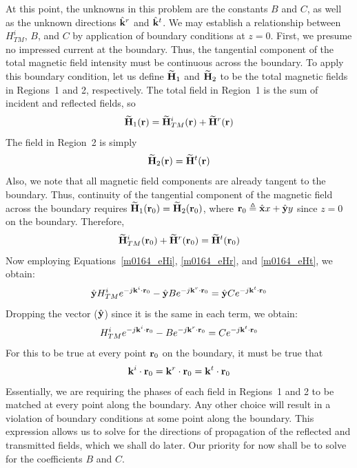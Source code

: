 At this point, the unknowns in this problem are the constants $B$ and $C$, as well as the unknown directions $\hat{\bf k}^r$ and $\hat{\bf k}^t$.  
We may establish a relationship between $H^i_{TM}$, $B$, and $C$ by application of boundary conditions at $z=0$.  
First, we presume no impressed current at the boundary.
Thus, the tangential component of the total magnetic field intensity must be continuous across the boundary.
To apply this boundary condition, let us define $\widetilde{\bf H}_1$ and $\widetilde{\bf H}_2$ to be the total magnetic fields in Regions~1 and 2, respectively.
The total field in Region~1 is the sum of incident and reflected fields, so
%
\begin{equation}
\widetilde{\bf H}_1({\bf r}) = \widetilde{\bf H}^i_{TM}({\bf r}) + \widetilde{\bf H}^r({\bf r})
\end{equation}
%
The field in Region~2 is simply
%
\begin{equation}
\widetilde{\bf H}_2({\bf r}) = \widetilde{\bf H}^t({\bf r})
\end{equation}
%
Also, we note that all magnetic field components are already tangent to the boundary.
Thus, continuity of the tangential component of the magnetic field across the boundary requires $\widetilde{\bf H}_1({\bf r}_0)=\widetilde{\bf H}_2({\bf r}_0)$,  
where ${\bf r}_0\triangleq\hat{\bf x}x+\hat{\bf y}y$ since $z=0$ on the boundary.
Therefore,
%
\begin{equation}
\widetilde{\bf H}^i_{TM}({\bf r}_0) + \widetilde{\bf H}^r({\bf r}_0)  = \widetilde{\bf H}^t({\bf r}_0) 
\end{equation}
%
Now employing Equations~\ref{m0164_eHi}, \ref{m0164_eHr}, and \ref{m0164_eHt}, we obtain:
%
\begin{equation}
\hat{\bf y}H^i_{TM}e^{-j{\bf k}^i\cdot{\bf r}_0} - 
\hat{\bf y}B         e^{-j{\bf k}^r\cdot{\bf r}_0} = 
\hat{\bf y}C         e^{-j{\bf k}^t\cdot{\bf r}_0}
\label{m0164_eBCH}
\end{equation}
%
Dropping the vector ($\hat{\bf y}$) since it is the same in each term, we obtain:
%
\begin{equation}
H^i_{TM}e^{-j{\bf k}^i\cdot{\bf r}_0} - 
B         e^{-j{\bf k}^r\cdot{\bf r}_0} = 
C         e^{-j{\bf k}^t\cdot{\bf r}_0}
\label{m0164_eBCH2}
\end{equation}
%
For this to be true at every point ${\bf r}_0$ on the boundary, it must be true that
%
\begin{equation}
{\bf k}^i\cdot{\bf r}_0 = {\bf k}^r\cdot{\bf r}_0 = {\bf k}^t\cdot{\bf r}_0
\label{m0164_eSL}
\end{equation}
%
%
Essentially, we are requiring the phases of each field in Regions~1 and 2 to be matched at every point along the boundary.
Any other choice will result in a violation of boundary conditions at some point along the boundary.
This expression allows us to solve for the directions of propagation of the reflected and transmitted fields, which we shall do later.  
Our priority for now shall be to solve for the coefficients $B$ and $C$. 

